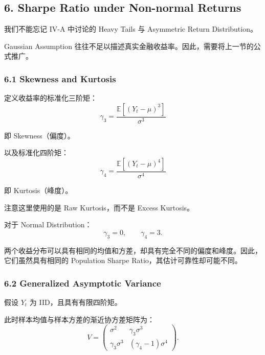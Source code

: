 \hypertarget{part-4-67-0001-sharpe-ratio-under-non-normal-returns}{%
\subsection{6. Sharpe Ratio under Non-normal Returns}\label{part-4-67-0001-sharpe-ratio-under-non-normal-returns}}

我们不能忘记 IV-A 中讨论的 Heavy Tails 与 Asymmetric Return Distribution。

Gaussian Assumption 往往不足以描述真实金融收益率。因此，需要将上一节的公式推广。

\hypertarget{part-4-67-0001-skewness-and-kurtosis}{%
\subsubsection{6.1 Skewness and Kurtosis}\label{part-4-67-0001-skewness-and-kurtosis}}

定义收益率的标准化三阶矩：
\[\boxed{
\gamma_3=
\frac{\mathbb E[(Y_t-\mu)^3]}{\sigma^3}
}\]

即 Skewness（偏度）。

以及标准化四阶矩：
\[\boxed{
\gamma_4=
\frac{\mathbb E[(Y_t-\mu)^4]}{\sigma^4}
}\]

即 Kurtosis（峰度）。

注意这里使用的是 Raw Kurtosis，而不是 Excess Kurtosis。

对于 Normal Distribution：
\[\gamma_3=0,\qquad\gamma_4=3.\]


两个收益分布可以具有相同的均值和方差，却具有完全不同的偏度和峰度。因此，它们虽然具有相同的 Population Sharpe Ratio，其估计可靠性却可能不同。

\hypertarget{part-4-67-0001-generalized-asymptotic-variance}{%
\subsubsection{6.2 Generalized Asymptotic Variance}\label{part-4-67-0001-generalized-asymptotic-variance}}

假设 \(Y_t\) 为 IID，且具有有限四阶矩。

此时样本均值与样本方差的渐近协方差矩阵为：
\[V=
\begin{pmatrix}
\sigma^2 & \gamma_3\sigma^3\\
\gamma_3\sigma^3 & (\gamma_4-1)\sigma^4
\end{pmatrix}.\]

